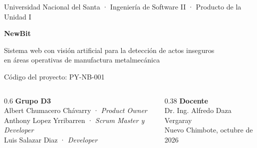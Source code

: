 \documentclass[aspectratio=169,11pt]{beamer}
\begin{document}
\begin{frame}[plain]
\vspace{0.6cm}
{\color{gris}\small Universidad Nacional del Santa · Ingeniería de Software II · Producto de la Unidad I}\par
\vspace{0.9cm}
{\fontsize{34}{38}\selectfont\bfseries NewBit\par}
\vspace{0.25cm}
{\large Sistema web con visión artificial para la detección de actos inseguros\\ en áreas operativas de manufactura metalmecánica\par}
\vspace{0.2cm}
{\color{gris}\small Código del proyecto: PY-NB-001\par}
\vfill
\begin{columns}[T]
\begin{column}{0.6\textwidth}\small
\textbf{Grupo D3}\\
Albert Chumacero Chávarry · \textit{Product Owner}\\
Anthony Lopez Yrribarren · \textit{Scrum Master y Developer}\\
Luis Salazar Diaz · \textit{Developer}
\end{column}
\begin{column}{0.38\textwidth}\small
\textbf{Docente}\\ Dr. Ing. Alfredo Daza Vergaray\\[4pt]
{\color{gris}Nuevo Chimbote, octubre de 2026}
\end{column}
\end{columns}
\vspace{0.3cm}
\end{frame}
\end{document}
